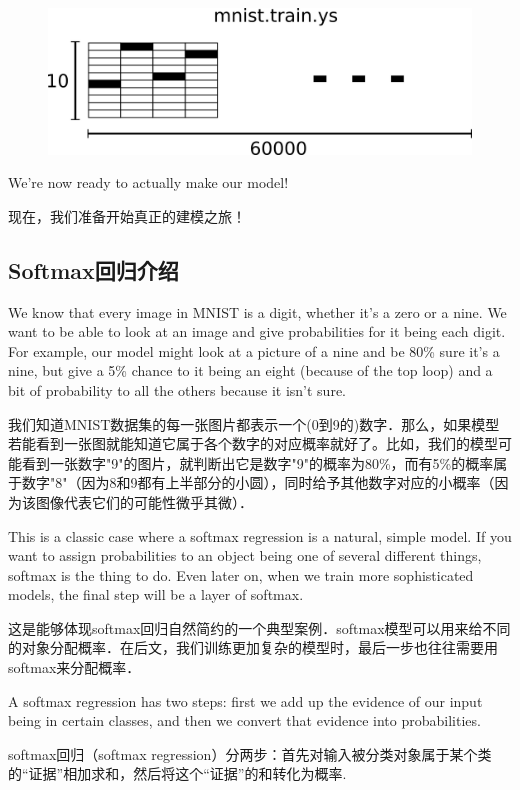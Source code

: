 \begin{figure}[htbp]
\centering
\includegraphics[width=.7\textwidth]{../SOURCE/images/mnist-train-ys.png}
\caption{}
\end{figure}

We're now ready to actually make our model!

现在，我们准备开始真正的建模之旅！

\subsection {Softmax回归介绍}

We know that every image in MNIST is a digit, whether it's a zero or a nine. We want to be able to look at an image and give probabilities for it being each digit. For example, our model might look at a picture of a nine and be 80\% sure it's a nine, but give a 5\% chance to it being an eight (because of the top loop) and a bit of probability to all the others because it isn't sure.

我们知道MNIST数据集的每一张图片都表示一个(0到9的)数字．那么，如果模型若能看到一张图就能知道它属于各个数字的对应概率就好了。比如，我们的模型可能看到一张数字"9"的图片，就判断出它是数字"9"的概率为80\%，而有5\%的概率属于数字"8"（因为8和9都有上半部分的小圆），同时给予其他数字对应的小概率（因为该图像代表它们的可能性微乎其微）．

This is a classic case where a softmax regression is a natural, simple model. If you want to assign probabilities to an object being one of several different things, softmax is the thing to do. Even later on, when we train more sophisticated models, the final step will be a layer of softmax.

这是能够体现softmax回归自然简约的一个典型案例．softmax模型可以用来给不同的对象分配概率．在后文，我们训练更加复杂的模型时，最后一步也往往需要用softmax来分配概率．

A softmax regression has two steps: first we add up the evidence of our input being in certain classes, and then we convert that evidence into probabilities.

softmax回归（softmax regression）分两步：首先对输入被分类对象属于某个类的“证据”相加求和，然后将这个“证据”的和转化为概率.

